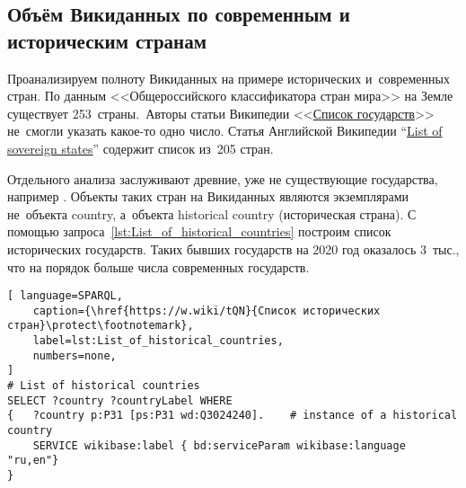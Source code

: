 \subsection{Объём Викиданных по современным и историческим странам}

Проанализируем полноту Викиданных на примере исторических и~современных стран. 
По данным <<Общероссийского классификатора стран мира>> 
на Земле существует 253~страны.\, %
Авторы статьи Википедии 
<<\href{https://ru.wikipedia.org/?curid=52627}{Список государств}>> 
не~смогли указать какое-то одно число. 
Статья Английской Вики\-педии 
``\href{https://en.wikipedia.org/?curid=68253}{List of sovereign states}'' 
содержит список из~205 стран. 

Отдельного анализа заслуживают древние, уже не существующие государства, 
например . 
Объекты таких стран на Викиданных являются экземплярами не~объекта country, 
а~объекта historical country (историческая страна). 
%
С помощью запроса~\ref{lst:List_of_historical_countries} построим список исторических государств. 
Таких бывших государств на 2020 год оказалось 3~тыс., что на порядок больше числа современных государств.
%


\begin{lstlisting}[ language=SPARQL, 
    caption={\href{https://w.wiki/tQN}{Список исторических стран}\protect\footnotemark},
    label=lst:List_of_historical_countries, 
    numbers=none,
]
# List of historical countries
SELECT ?country ?countryLabel WHERE
{   ?country p:P31 [ps:P31 wd:Q3024240].    # instance of a historical country
    SERVICE wikibase:label { bd:serviceParam wikibase:language "ru,en"} 
}
\end{lstlisting}




